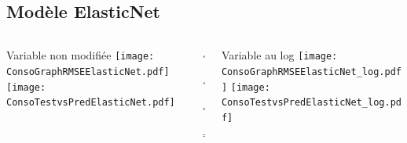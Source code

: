 \documentclass[8pt,aspectratio=169,hyperref={unicode=true}]{beamer}
\begin{document}
\subsection{Modèle ElasticNet}
\begin{frame}{\insertsubsection}
  \begin{columns}[t]
    \begin{column}{.31\textwidth}
      \centering Variable non modifiée
      \texttt{[image: ConsoGraphRMSEElasticNet.pdf]}
      \texttt{[image: ConsoTestvsPredElasticNet.pdf]}
    \end{column}
    \begin{column}{.38\textwidth}
      $\Longleftarrow$
      \scriptsize
      {\centering
        }
      

      \normalsize
      $\Longleftarrow$

      \raggedleft $\Longrightarrow$
      \scriptsize
      {\centering
        }
      

      \normalsize
      $\Longrightarrow$
    \end{column}
    \begin{column}{.31\textwidth}
      \centering Variable au log
      \texttt{[image: ConsoGraphRMSEElasticNet\_log.pdf]}
      \texttt{[image: ConsoTestvsPredElasticNet\_log.pdf]}
    \end{column}
  \end{columns}
\end{frame}
\end{document}
